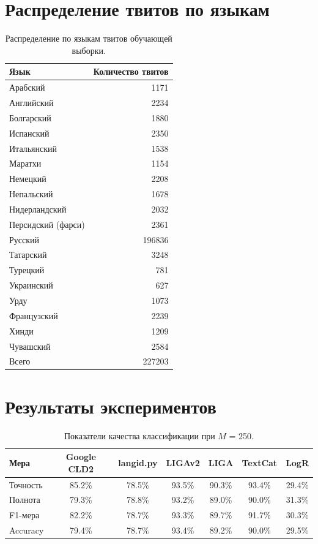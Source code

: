\documentclass[a4paper, 14pt]{article}
\begin{document}
\section{Распределение твитов по языкам}
				\begin{center}
			\begin{table}[h]
			\begin{tabular*}{\textwidth}{|@{\extracolsep{\fill} }l  r|}
				\hline
				Язык  & Количество твитов \\
				\hline
				Арабский & 1171 \\
				Английский & 2234 \\
				Болгарский & 1880 \\
				Испанский & 2350 \\
				Итальянский & 1538 \\
				Маратхи & 1154 \\
				Немецкий & 2208 \\
				Непальский & 1678 \\
				Нидерландский & 2032 \\
				Персидский (фарси) & 2361 \\
				Русский & 196836 \\
				Татарский & 3248 \\
				Турецкий & 781 \\
				Украинский & 627 \\
				Урду & 1073 \\
				Французский & 2239 \\
				Хинди & 1209 \\
				Чувашский & 2584 \\
				\hline
				Всего & 227203 \\
				\hline
			\end{tabular*}
			\caption{Распределение по языкам твитов обучающей выборки.}
			\label{table:lang}
			\end{table}
			\end{center}	
\pagebreak
\section{Результаты экспериментов}
\begin{center}
\begin{table}[h]
\begin{tabular*}{0.954\textwidth}{| l| *{6}{|c} |}
\hline 
Мера & Google CLD2 & langid.py & LIGAv2 & LIGA & TextCat  & LogR\\
\hline
Точность & 85.2\% & 78.5\% & 93.5\% & 90.3\% & 93.4\% & 29.4\%\\
Полнота & 79.3\% & 78.8\% & 93.2\% & 89.0\% & 90.0\% & 31.3\%\\
F1-мера & 82.2\% & 78.7\% & 93.3\% & 89.7\% & 91.7\% & 30.3\%\\
Accuracy & 79.4\% & 78.7\% & 93.4\% & 89.2\% & 90.0\% & 29.5\%\\
\hline
\end{tabular*}
\caption{Показатели качества классификации при $M$ = 250.}
\label{table:250}
\end{table}
\end{center}
\end{document}
